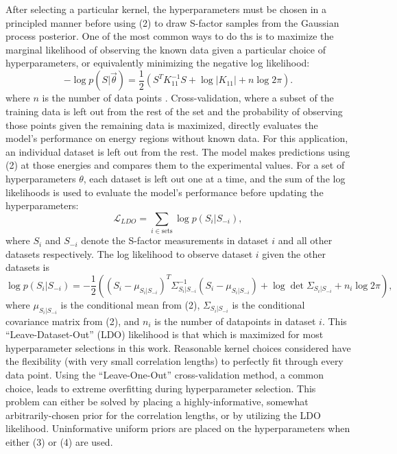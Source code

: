\documentclass[%
 reprint,
superscriptaddress,
nofootinbib,
 amsmath,amssymb,
 aps,
 pra,
]{revtex4-2}
\begin{document}
After selecting a particular kernel, the hyperparameters must be chosen in a principled manner before using (2) to draw S-factor samples from the Gaussian process posterior. One of the most common ways to do ths is to maximize the marginal likelihood of observing the known data given a particular choice of hyperparameters, or equivalently minimizing the negative log likelihood: 
\begin{equation}
	-\log{p\left( S | \vec{\theta} \right)} = \frac{1}{2} \left( S^T K_{11}^{-1} S + \log{|K_{11}|} + n \log{2\pi} \right).
\end{equation}
where $n$ is the number of data points \cite{Rasmussen2006}. Cross-validation, where a subset of the training data is left out from the rest of the set and the probability of observing those points given the remaining data is maximized, directly evaluates the model's performance on energy regions without known data. For this application, an individual dataset is left out from the rest. The model makes predictions using (2) at those energies and compares them to the experimental values. For a set of hyperparameters $\theta$, each dataset is left out one at a time, and the sum of the log likelihoods is used to evaluate the model's performance before updating the hyperparameters:
\begin{equation}
	\mathcal{L}_{LDO} = \sum_{i\in\text{sets}} \log p(S_i | S_{-i}),
\end{equation}
where $S_i$ and $S_{-i}$ denote the S-factor measurements in dataset $i$ and all other datasets respectively. The log likelihood to observe dataset $i$ given the other datasets is 
\begin{equation}
	\log p(S_i | S_{-i}) = -\frac{1}{2} \left( (S_i - \mu_{S_i | S_{-i}})^T \Sigma_{S_i | S_{-i}}^{-1} (S_i - \mu_{S_i | S_{-i}}) + \log \det  \Sigma_{S_i | S_{-i}} + n_i \log 2\pi \right), \nonumber
\end{equation}
where $\mu_{S_i | S_{-i}}$ is the conditional mean from (2),  $\Sigma_{S_i | S_{-i}}$ is the conditional covariance matrix from (2), and $n_i$ is the number of datapoints in dataset $i$. This ``Leave-Dataset-Out'' (LDO) likelihood is that which is maximized for most hyperparameter selections in this work. Reasonable kernel choices considered have the flexibility (with very small correlation lengths) to perfectly fit through every data point. Using the ``Leave-One-Out'' cross-validation method, a common choice, leads to extreme overfitting during hyperparameter selection. This problem can either be solved by placing a highly-informative, somewhat arbitrarily-chosen prior for the correlation lengths, or by utilizing the LDO likelihood. Uninformative uniform priors are placed on the hyperparameters when either (3) or (4) are used.
\end{document}
